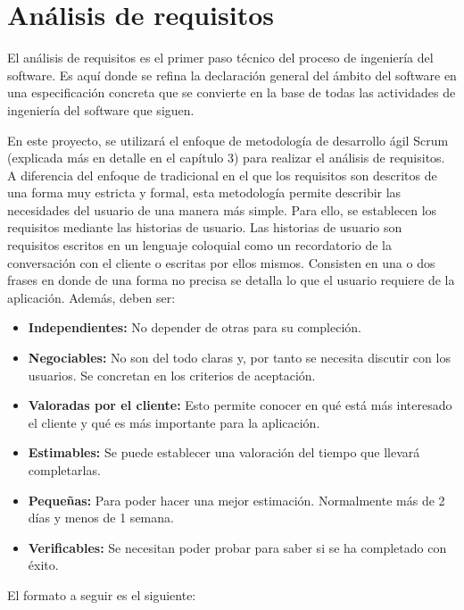 
\chapter{Análisis de requisitos}
El análisis de requisitos es el primer paso técnico del proceso de ingeniería del software. Es aquí donde se refina la declaración general del ámbito del software en una especificación concreta que se convierte en la base de todas las actividades de ingeniería del software que siguen.

En este proyecto, se utilizará el enfoque de metodología de desarrollo ágil Scrum (explicada más en detalle en el capítulo 3) para realizar el análisis de requisitos. A diferencia del enfoque de tradicional en el que los requisitos son descritos de una forma muy estricta y formal, esta metodología permite describir las necesidades del usuario de una manera más simple. Para ello, se establecen los requisitos mediante las historias de usuario. Las historias de usuario son requisitos escritos en un lenguaje coloquial como un recordatorio de la conversación con el cliente o escritas por ellos mismos. Consisten en una o dos frases en donde de una forma no precisa se detalla lo que el usuario requiere de la aplicación. Además, deben ser:

\begin{itemize}
\item \textbf{Independientes:} No depender de otras para su compleción.
\item \textbf{Negociables:} No son del todo claras y, por tanto se necesita discutir con los usuarios. Se concretan en los criterios de aceptación.
\item \textbf{Valoradas por el cliente:} Esto permite conocer en qué está más interesado el cliente y qué es más importante para la aplicación.
\item \textbf{Estimables:} Se puede establecer una valoración del tiempo que llevará completarlas.
\item \textbf{Pequeñas:} Para poder hacer una mejor estimación. Normalmente más de 2 días y menos de 1 semana.
\item \textbf{Verificables:} Se necesitan poder probar para saber si se ha completado con éxito. 
\end{itemize}

El formato a seguir es el siguiente:

